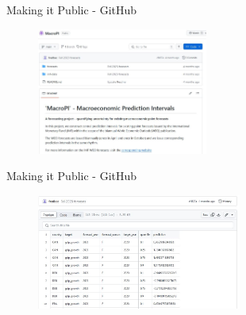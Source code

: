 \documentclass[en]{sdqbeamer}
\begin{document}


\addtocounter{framenumber}{-1}
\begin{frame}{Making it Public - GitHub}
    \begin{figure}
        \centering
        \includegraphics[width=0.5\textwidth]{figures_svr/GitHub_Capture2.jpg}
        \label{fig:enter-label}
    \end{figure}
\end{frame}

\addtocounter{framenumber}{-1}
\begin{frame}{Making it Public - GitHub}
\begin{figure}
        \centering
        \includegraphics[width=0.6\textwidth]{figures_svr/GitHub_Capture1.jpg}
        \label{fig:enter-label}
    \end{figure}


\end{frame}
\end{document}
